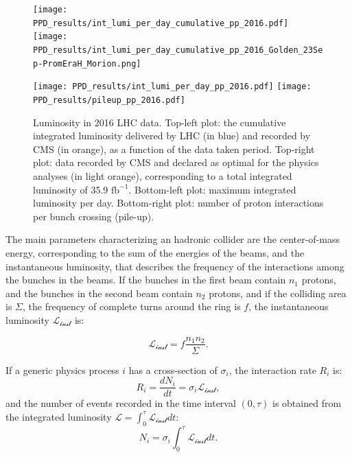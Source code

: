 \begin{figure}[!htb]
  \centering
    \texttt{[image: PPD\_results/int\_lumi\_per\_day\_cumulative\_pp\_2016.pdf]}%
    \texttt{[image: PPD\_results/int\_lumi\_per\_day\_cumulative\_pp\_2016\_Golden\_23Sep-PromEraH\_Morion.png]}

    \texttt{[image: PPD\_results/int\_lumi\_per\_day\_pp\_2016.pdf]}%
    \texttt{[image: PPD\_results/pileup\_pp\_2016.pdf]}

  \caption{Luminosity in 2016 LHC data. Top-left plot: the cumulative integrated luminosity delivered by LHC (in blue) and recorded by CMS (in orange), as a function of the data taken period. Top-right plot: data recorded by CMS and declared as optimal for the physics analyses (in light orange), corresponding to a total integrated luminosity of 35.9 $\text{fb}^{-1}$. Bottom-left plot: maximum integrated luminosity per day. Bottom-right plot: number of proton interactions per bunch crossing (pile-up).}
  \label{fig:LHC_lumi}
\end{figure}

\noindent The main parameters characterizing an hadronic collider are the center-of-mass energy, corresponding to the sum of the energies of the beams, and the instantaneous luminosity, that describes the frequency of the interactions among the bunches in the beams. If the bunches in the first beam contain $n_1$ protons, and the bunches in the second beam contain $n_2$ protons, and if the colliding area is $\Sigma$, the frequency of complete turns
around the ring is $f$, the instantaneous luminosity $\mathcal{L_{\text{inst}}}$ is:

\begin{equation}
\mathcal{L_{\text{inst}}} = f \frac{n_1 n_2}{\Sigma}.
\label{eq:LHC_luminosity_def}
\end{equation}

\noindent If a generic physics process $i$ has a cross-section of $\sigma_i$, the interaction rate $R_i$ is:
\begin{equation}
R_i = \frac{dN_i}{dt}= \sigma_i \mathcal{L_{\text{inst}}},
\label{eq:LHC_interaction_rate}
\end{equation}
and the number of events recorded in the time interval $(0,\tau)$ is obtained from the integrated luminosity $\mathcal{L} = \int_0^{\tau} \mathcal{L_{\text{inst}}} dt$:
\begin{equation}
N_i = \sigma_i \int_0^{\tau} \mathcal{L_{\text{inst}}} dt.
\end{equation}

